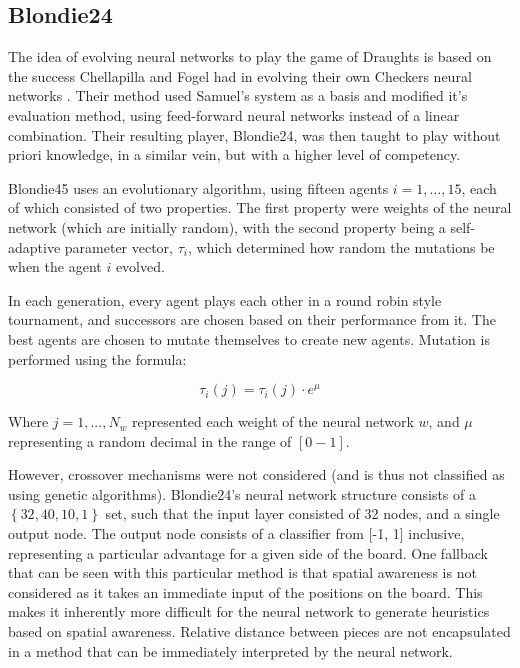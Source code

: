 \documentclass[12pt,a4paper]{article}
\begin{document}
    \subsection{Blondie24}

        The idea of evolving neural networks to play the game of Draughts is based on the success Chellapilla and Fogel had in evolving their own Checkers neural networks \cite{chellapilla_evolving_1999}. Their method used Samuel's system as a basis and modified it's evaluation method, using feed-forward neural networks instead of a linear combination. Their resulting player, Blondie24, was then taught to play without priori knowledge, in a similar vein, but with a higher level of competency.

        Blondie45 uses an evolutionary algorithm, using fifteen agents $i=1,\dots,15$, each of which consisted of two properties. The first property were weights of the neural network (which are initially random), with the second property being a self-adaptive parameter vector, $\tau_i$, which determined how random the mutations be when the agent $i$ evolved.
        
        In each generation, every agent plays each other in a round robin style tournament, and successors are chosen based on their performance from it. The best agents are chosen to mutate themselves to create new agents. Mutation is performed using the formula:

        $$
        \tau_i(j) = \tau_i(j) \cdot e^{\mu}
        $$
        
        Where $j=1,...,N_w$ represented each weight of the neural network $w$, and $\mu$ representing a random decimal in the range of $[0-1]$. 

        However, crossover mechanisms were not considered (and is thus not classified as using genetic algorithms). Blondie24's neural network structure consists of a $\left\{ 32,40,10,1 \right\}$ set, such that the input layer consisted of 32 nodes, and a single output node. The output node consists of a classifier from [-1, 1] inclusive, representing a particular advantage for a given side of the board. One fallback that can be seen with this particular method is that spatial awareness is not considered as it takes an immediate input of the positions on the board. This makes it inherently more difficult for the neural network to generate heuristics based on spatial awareness. Relative distance between pieces are not encapsulated in a method that can be immediately interpreted by the neural network.
\end{document}
